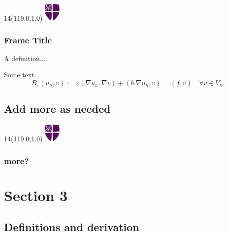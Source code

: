 \documentclass[xcolor=dvipsnames,usepdftitle=false]{beamer}
\newcommand{\MyLogo}{%
	\begin{textblock}{14}(119.0,1.0) %
		\includegraphics[width=0.8cm]{pictures/logo_only.eps}
	\end{textblock}
}
\renewcommand\epsilon{\varepsilon}
\begin{document}
\begin{frame}
	\MyLogo
	\frametitle{Frame Title}
	A definition...
	\begin{definition}
		Some text...
		\begin{equation}
			B_{\epsilon}(u_h,v) := \epsilon (\nabla u_h, \nabla v) + (b.\nabla u_h, v) = (f,v) \quad \forall v \in V_h. \nonumber
		\end{equation}
	\end{definition}

\end{frame}

\subsection*{Add more as needed}

\begin{frame}
	\MyLogo
	\frametitle{more?}
	
\end{frame}


\section{Section 3}

\subsection*{Definitions and derivation}
\end{document}
